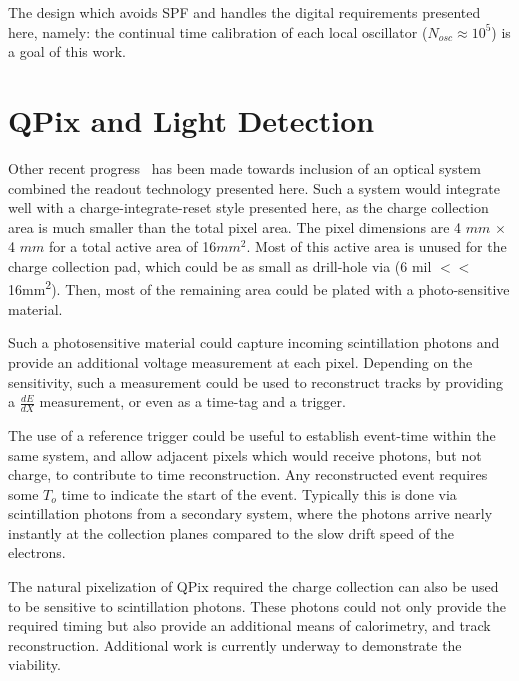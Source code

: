 The design which avoids SPF and handles the digital requirements presented here, namely: the continual time calibration of each local oscillator ($N_{osc} \approx 10^{5}$) is a goal of this work.

\section{QPix and Light Detection}

Other recent progress~\citep{https://doi.org/10.48550/arxiv.2207.11127} has been made towards inclusion of an optical system combined the readout technology presented here.
Such a system would integrate well with a charge-integrate-reset style presented here, as the charge collection area is much smaller than the total pixel area.
The pixel dimensions are 4 $\unit{mm}$ $\times$ 4 $\unit{mm} $ for a total active area of 16$\unit{mm^{2}}$.
Most of this active area is unused for the charge collection pad, which could be as small as drill-hole via (6 mil $<<$ 16\unit{mm^2}).
Then, most of the remaining area could be plated with a photo-sensitive material.

Such a photosensitive material could capture incoming scintillation photons and provide an additional voltage measurement at each pixel.
Depending on the sensitivity, such a measurement could be used to reconstruct tracks by providing a $\frac{dE}{dX}$ measurement, or even as a time-tag and a trigger.

The use of a reference trigger could be useful to establish event-time within the same system, and allow adjacent pixels which would receive photons, but not charge, to contribute to time reconstruction.
Any reconstructed event requires some $T_{o}$ time to indicate the start of the event.
Typically this is done via scintillation photons from a secondary system, where the photons arrive nearly instantly at the collection planes compared to the slow drift speed of the electrons.

The natural pixelization of QPix required the charge collection can also be used to be sensitive to scintillation photons.
These photons could not only provide the required timing but also provide an additional means of calorimetry, and track reconstruction.
Additional work is currently underway to demonstrate the viability.
